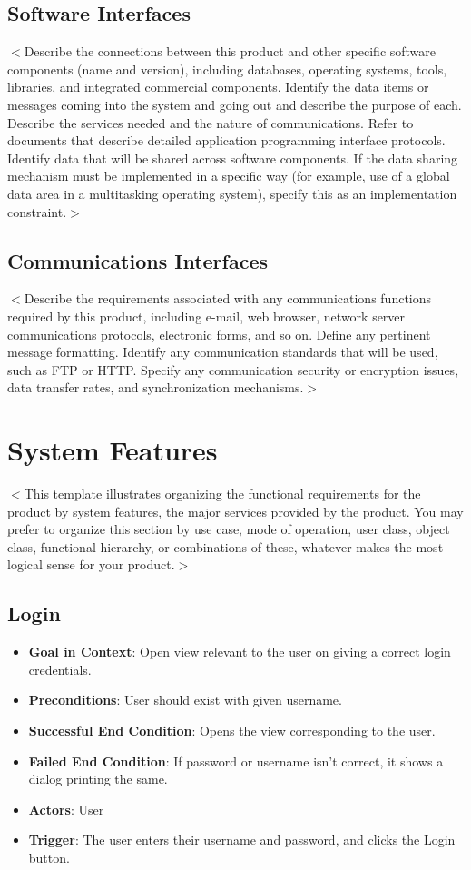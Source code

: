 \documentclass{scrreprt}
\begin{document}
\section{Software Interfaces}
$<$Describe the connections between this product and other specific software 
components (name and version), including databases, operating systems, tools, 
libraries, and integrated commercial components. Identify the data items or 
messages coming into the system and going out and describe the purpose of each.  
Describe the services needed and the nature of communications. Refer to 
documents that describe detailed application programming interface protocols.  
Identify data that will be shared across software components. If the data 
sharing mechanism must be implemented in a specific way (for example, use of a 
global data area in a multitasking operating system), specify this as an 
implementation constraint.$>$

\section{Communications Interfaces}
$<$Describe the requirements associated with any communications functions 
required by this product, including e-mail, web browser, network server 
communications protocols, electronic forms, and so on. Define any pertinent 
message formatting. Identify any communication standards that will be used, such 
as FTP or HTTP. Specify any communication security or encryption issues, data 
transfer rates, and synchronization mechanisms.$>$


\chapter{System Features}
$<$This template illustrates organizing the functional requirements for the 
product by system features, the major services provided by the product. You may 
prefer to organize this section by use case, mode of operation, user class, 
object class, functional hierarchy, or combinations of these, whatever makes the 
most logical sense for your product.$>$

\section{Login}
\begin{itemize}
\item \textbf{Goal in Context}: Open view relevant to the user on giving a correct login credentials.
\item \textbf{Preconditions}: User should exist with given username.
\item \textbf{Successful End Condition}: Opens the view corresponding to the user.
\item \textbf{Failed End Condition}: If password or username isn't correct, it shows a dialog printing the same.
\item \textbf{Actors}: User
\item \textbf{Trigger}: The user enters their username and password, and clicks the Login button.
\end{itemize}
\end{document}
